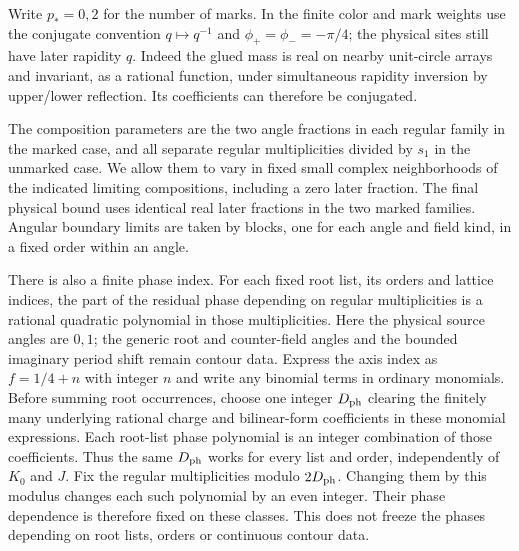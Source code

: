 \documentclass[11pt]{article}
\numberwithin{equation}{section}
\theoremstyle{definition}\newtheorem{definition}[theorem]{Definition}
\theoremstyle{remark}\newtheorem{remark}[theorem]{Remark}
\begin{document}
Write $p_*=0,2$ for the number of marks. In the finite color and mark
weights use the conjugate convention $q\mapsto q^{-1}$ and
$\phi_+=\phi_-=-\pi/4$; the physical sites still have later rapidity $q$.
Indeed the glued mass is real on nearby unit-circle arrays and invariant,
as a rational function, under simultaneous rapidity inversion by
upper/lower reflection. Its coefficients can therefore be conjugated.

The composition parameters are the two angle fractions in each regular
family in the marked case, and all separate regular multiplicities divided
by $s_1$ in the unmarked case. We allow them to vary in fixed small complex
neighborhoods of the indicated limiting compositions, including a zero
later fraction. The final physical bound uses identical real later
fractions in the two marked families. Angular boundary limits are taken
by blocks, one for each angle and field kind, in a fixed order within an
angle.

There is also a finite phase index. For each fixed root list, its
orders and lattice indices, the part of the residual phase depending on
regular multiplicities is a rational quadratic polynomial in those
multiplicities. Here the physical source angles are $0,1$; the generic
root and counter-field angles and the bounded imaginary period shift
remain contour data. Express the axis index as $f=1/4+n$ with integer
$n$ and write any binomial terms in ordinary monomials. Before summing root occurrences, choose one integer $D_{\rm ph}$
clearing the finitely many underlying rational charge and bilinear-form
coefficients in these monomial expressions. Each root-list phase
polynomial is an integer combination of those coefficients. Thus the
same $D_{\rm ph}$ works for every list and order, independently of
$K_0$ and $J$. Fix the regular multiplicities
modulo $2D_{\rm ph}$. Changing them by this modulus changes each such
polynomial by an even integer. Their phase dependence is therefore fixed
on these classes. This does not freeze the phases depending on root lists,
orders or continuous contour data.
\end{document}
